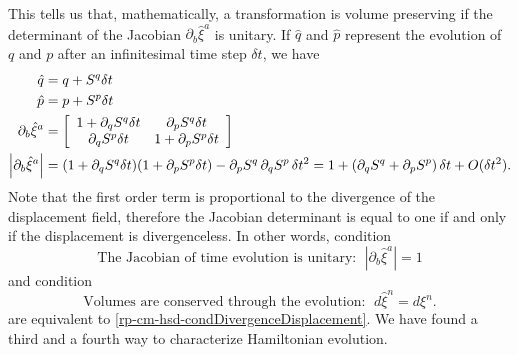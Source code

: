 This tells us that, mathematically, a transformation is volume preserving if the determinant of the Jacobian $\partial_b \hat{\xi}^a$ is unitary. If $\hat{q}$ and $\hat{p}$ represent the evolution of $q$ and $p$ after an infinitesimal time step $\delta t$, we have
\begin{equation}
	\begin{aligned}
	\hat{q} &= q + S^q \delta t \\ 
	\hat{p} &= p + S^p \delta t \\ 
	\partial_b \hat{\xi}^a &= \left[\begin{array}{ c c }
		1 + \partial_q S^q \delta t & \partial_p S^q \delta t \\
		\partial_q S^p \delta t & 1 + \partial_p S^p \delta t \\
	\end{array} \right] \\
	\left|\partial_b \hat{\xi}^a\right| &= (1 + \partial_q S^q \delta t) (1 + \partial_p S^p \delta t) - \partial_p S^q \, \partial_q S^p \, \delta t^2  = 1 + \left(\partial_q S^q + \partial_p S^p \right) \delta t + O(\delta t^2). 
	\end{aligned}
\end{equation}
Note that the first order term is proportional to the divergence of the displacement field, therefore the Jacobian determinant is equal to one if and only if the displacement is divergenceless. In other words, condition
\begin{equation}\label{rp-cm-hsd-condUnitaryJacobian}
	\tag{HM-3}
	\text{The Jacobian of time evolution is unitary: } \; \left|\partial_b \hat{\xi}^a\right|=1
\end{equation}
and condition
\begin{equation}\label{rp-cm-hsd-condConservedVolume}
	\tag{HM-4}
	\text{Volumes are conserved through the evolution: } \; d\hat{\xi}^n = d\xi^n.
\end{equation}
are equivalent to \ref{rp-cm-hsd-condDivergenceDisplacement}. We have found a third and a fourth way to characterize Hamiltonian evolution.


